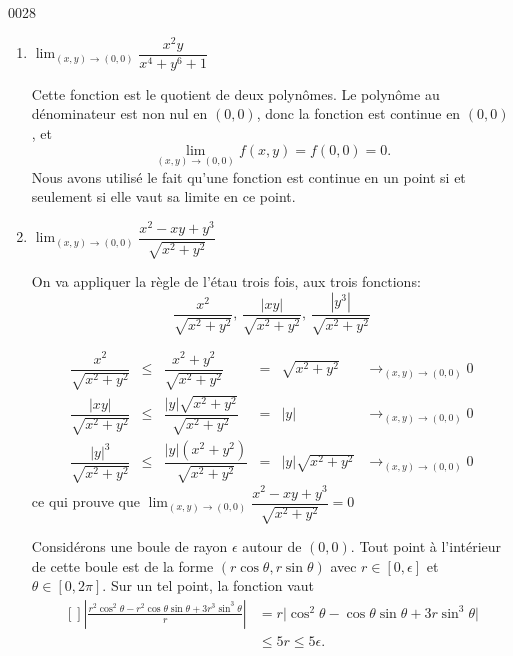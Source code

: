 
\begin{corrige}{0028}
	\begin{enumerate}
		\item $\lim_{(x,y)\rightarrow (0,0)} \dfrac{x^2y}{x^4+y^6+1}$

		      Cette fonction est le quotient de deux polynômes. Le polynôme au dénominateur est non nul en $(0,0)$, donc la fonction est continue en $(0,0)$, et
		      \begin{equation}
			      \lim_{(x,y)\rightarrow (0,0)}f(x,y)= f(0,0) = 0.
		      \end{equation}
		      Nous avons utilisé le fait qu'une fonction est continue en un point si et seulement si elle vaut sa limite en ce point.


		\item  $\lim_{(x,y)\rightarrow (0,0)} \dfrac{x^2-xy+y^3}{\sqrt{x^2+y^2}}$

		      On va appliquer la règle de l'étau trois fois, aux trois fonctions:
		      \[\dfrac{x^2}{\sqrt{x^2+y^2}}, \, \dfrac{|xy|}{\sqrt{x^2+y^2}}, \, \dfrac{|y^3|}{\sqrt{x^2+y^2}}\]

		      \[\begin{array}{cccccc}

				      \dfrac{x^2}{\sqrt{x^2+y^2}}   & \leq & \dfrac{x^2+y^2}{\sqrt{x^2+y^2}}           & = & \sqrt{x^2+y^2}    & \longrightarrow_{(x,y)\rightarrow (0,0)}0 \\

				      \dfrac{|xy|}{\sqrt{x^2+y^2}}  & \leq & \dfrac{|y|\sqrt{x^2+y^2}}{\sqrt{x^2+y^2}} & = & |y|               & \longrightarrow_{(x,y)\rightarrow (0,0)}0 \\

				      \dfrac{|y|^3}{\sqrt{x^2+y^2}} & \leq & \dfrac{|y|(x^2+y^2)}{\sqrt{x^2+y^2}}      & = & |y|\sqrt{x^2+y^2} & \longrightarrow_{(x,y)\rightarrow (0,0)}0
			      \end{array} \]
		      ce qui prouve que  $\lim_{(x,y)\rightarrow (0,0)} \dfrac{x^2-xy+y^3}{\sqrt{x^2+y^2}} = 0$

		      \begin{alternative}
			      Considérons une boule de rayon $\epsilon$ autour de $(0,0)$. Tout point à l'intérieur de cette boule est de la forme $(r\cos\theta,r\sin\theta)$ avec $r\in[0,\epsilon]$ et $\theta\in[0,2\pi]$. Sur un tel point, la fonction vaut
			      \begin{equation}
				      \begin{aligned}[]
					      \left| \frac{ r^2\cos^2\theta -r^2\cos\theta\sin\theta+3r^3\sin^3\theta }{ r }\right| & =r\big| \cos^2\theta-\cos\theta\sin\theta+3r\sin^3\theta \big| \\
					                                                                                            & \leq 5r\leq 5\epsilon.
				      \end{aligned}
			      \end{equation}


\end{alternative}
\end{enumerate}
\end{corrige}
